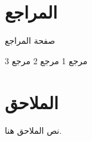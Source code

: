 \documentclass[a4paper,12pt]{book}
\begin{document}
\begin{otherlanguage}{arabic}
	\chapter*{المراجع}
	صفحة المراجع
	
	\begin{thebibliography}{9}
		 مرجع 1
		 مرجع 2
		 مرجع 3
	\end{thebibliography}
	 
	\chapter*{الملاحق}
	نص الملاحق هنا.
	
	
	
	\end{otherlanguage}
	
\end{document}
